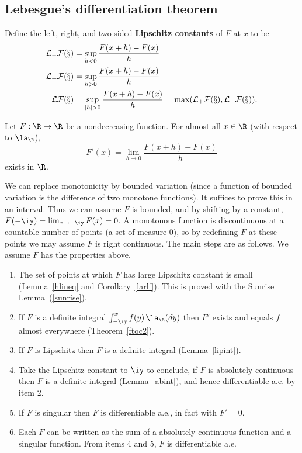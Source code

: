 \subsection{Lebesgue's differentiation theorem}
\begin{df}
Define the left, right, and two-sided \textbf{Lipschitz constants} of $F$ at $x$ to be
\begin{align*}
\cal L_-F(x)&=\sup_{h<0} \frac{F(x+h)-F(x)}{h}\\
\cal L_+F(x)&=\sup_{h>0} \frac{F(x+h)-F(x)}{h}\\
\cal LF(x)&=\sup_{|h|>0} \frac{F(x+h)-F(x)}{h}=\max(\cal L_+F(x),\cal L_-F(x)).
\end{align*}
\end{df}
\begin{thm}\label{Lebesgue's differentiation theorem}
Let $F:\R\to \R$ be a nondecreasing function. %
For almost all $x\in \R$ (with respect to $\la_{\R}$),
\[F'(x)=\lim_{h\to 0} \frac{F(x+h)-F(x)}{h}\]
exists in $\R$.
\end{thm}
We can replace monotonicity by bounded variation (since a function of bounded variation is the difference of two monotone functions).
It suffices to prove this in an interval. Thus we can assume $F$ is bounded, and by shifting by a constant, $F(-\iy)=\lim_{x\to -\iy} F(x)=0$. 
A monotonous function is discontinuous at a countable number of points (a set of measure 0), so by redefining $F$ at these points we may assume $F$ is right continuous.
The main steps are as follows. We assume $F$ has the properties above.
\begin{enumerate}
\item The set of points at which $F$ has large Lipschitz constant is small (Lemma~\ref{hlineq} and Corollary~\ref{larlf}). This is proved with the Sunrise Lemma~(\ref{sunrise}).
\item If $F$ is a definite integral $\int_{-\iy}^x f(y)\,\la_{\R}(dy)$ then $F'$ exists and equals $f$ almost everywhere (Theorem~\ref{ftoc2}).
\item If $F$ is Lipschitz then $F$ is a definite integral (Lemma~\ref{lipint}).
\item Take the Lipschitz constant to $\iy$ to conclude, if $F$ is absolutely continuous then $F$ is a definite integral (Lemma~\ref{abint}), and hence differentiable a.e. by item 2.
\item If $F$ is singular then $F$ is differentiable a.e., in fact with $F'=0$.
\item Each $F$ can be written as the sum of a absolutely continuous function and a singular function. From items 4 and 5, $F$ is differentiable a.e.
\end{enumerate}

